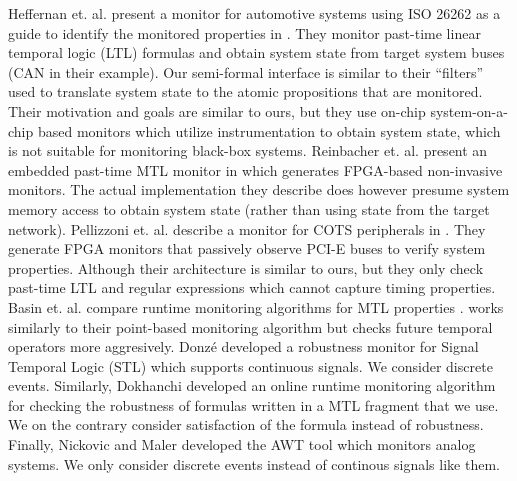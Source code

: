 Heffernan et. al. present a monitor for automotive systems using ISO 26262 as a guide to identify the monitored properties in \cite{Heffernan2014}.
They monitor past-time linear temporal logic (LTL) formulas and obtain system state from target system buses (CAN in their example).
Our semi-formal interface is similar to their ``filters'' used to translate system state to the atomic propositions that are monitored.
Their motivation and goals are similar to ours, but they use on-chip system-on-a-chip based monitors which utilize instrumentation to obtain system state, which is not suitable for monitoring black-box systems.
Reinbacher et. al. present an embedded past-time MTL monitor in \cite{Reinbacher2013} which generates FPGA-based non-invasive monitors.
The actual implementation they describe does however presume system memory access to obtain system state (rather than using state from the target network).
Pellizzoni et. al. describe a monitor for COTS peripherals in \cite{Pellizzoni2008}.
They generate FPGA monitors that passively observe PCI-E buses to verify system properties.
Although their architecture is similar to ours, but they only check past-time LTL and
regular expressions which cannot capture timing properties.
Basin et. al. compare runtime monitoring algorithms for MTL properties \cite{Basin2012}.
\monitor works similarly to their point-based monitoring algorithm but \monitor checks
future temporal operators more aggresively.
Donz\'e \etal \cite{DFM13} developed a robustness monitor for Signal Temporal Logic (STL) which
supports continuous signals. We consider discrete events. Similarly, Dokhanchi \etal \cite{DHF14}
developed an online runtime monitoring algorithm for checking the robustness of formulas written in a
MTL fragment that we use. We on the contrary consider satisfaction of the formula instead of robustness.
Finally, Nickovic and Maler \cite{NM07} developed the  AWT tool which monitors analog systems.
We only consider discrete events instead of continous signals like them.
